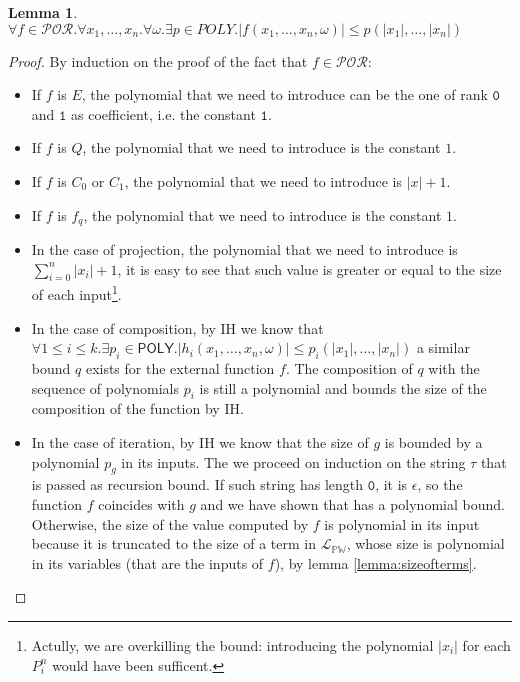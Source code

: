 \documentclass[10pt]{amsart}
\newcommand{\POLY}{\mathsf{POLY}}
\newcommand{\POR}{\mathcal{POR}}
\newcommand{\zero}{\mathtt{0}}
\newcommand{\one}{\mathtt{1}}
\newcommand{\vone}{x}
\newcommand{\stwo}{\tau}
\newcommand{\oone}{\omega}
\newtheorem{lemma}{Lemma}
\begin{document}
\begin{lemma}
\label{lemma:sizeofpor}
$\forall f \in \POR.\forall \vone_1,\ldots, \vone_n.\forall\oone.\exists p \in POLY. |f(\vone_1, \ldots, \vone_n, \oone)| \le p(|\vone_1|, \ldots, |\vone_n|)$
\end{lemma}
\begin{proof}
By induction on the proof of the fact that $f \in \POR$:
\begin{itemize}
\item If $f$ is $E$, the polynomial that we need to introduce can be the one of rank $\zero$ and $\one$ as coefficient, i.e. the constant $\one$.
\item If $f$ is $Q$, the polynomial that we need to introduce is the constant $1$.
\item If $f$ is $C_0$ or $C_1$, the polynomial that we need to introduce is $|\vone|+1$.
\item If $f$ is $f_q$, the polynomial that we need to introduce is the constant $1$.
\item In the case of projection, the polynomial that we need to introduce is $\sum_{i=0}^n|\vone_i|+1$, it is easy to see that such value is greater or equal to the size of each input\footnote{Actully, we are overkilling the bound: introducing the polynomial $|\vone_i|$ for each $P^n_i$ would have been sufficent.}.
\item In the case of composition, by IH we know that $\forall 1 \le i\le k. \exists p_i \in \POLY. |h_i(\vone_1, \ldots, \vone_n, \oone)| \le p_i(|\vone_1|, \ldots, |\vone_n|)$ a similar bound $q$ exists for the external function $f$. The composition of $q$ with the sequence of polynomials $p_i$ is still a polynomial and bounds the size of the composition of the function by IH.
\item In the case of iteration, by IH we know that the size of $g$ is bounded by a polynomial $p_g$ in its inputs. The we proceed on induction on the string $\stwo$ that is passed as recursion bound. If such string has length $\zero$, it is $\epsilon$, so the function $f$ coincides with $g$ and we have shown that has a polynomial bound. Otherwise, the size of the value computed by $f$ is polynomial in its input because it is truncated to the size of a term in $\mathcal L_{\mathbb P\mathbb W}$, whose size is polynomial in its variables (that are the inputs of $f$), by lemma \ref{lemma:sizeofterms}.
\end{itemize}
\end{proof}
\end{document}
